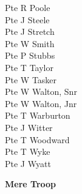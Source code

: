 \begin{multicols}{3}
  Pte R Poole \\
  Pte J Steele \\
  Pte J Stretch \\
  Pte W Smith \\
  Pte P Stubbs \\
  Pte T Taylor \\
  Pte W Tasker \\
  Pte W Walton, Snr \\
  Pte W Walton, Jnr \\
  Pte T Warburton \\
  Pte J Witter \\
  Pte T Woodward \\
  Pte T Wyke \\
  Pte J Wyatt \\
\end{multicols}

\vspace*{10mm}

\pagebreak

\begin{center}
  \Large
  \textbf{Mere Troop}
\end{center}

\vspace*{10mm}

